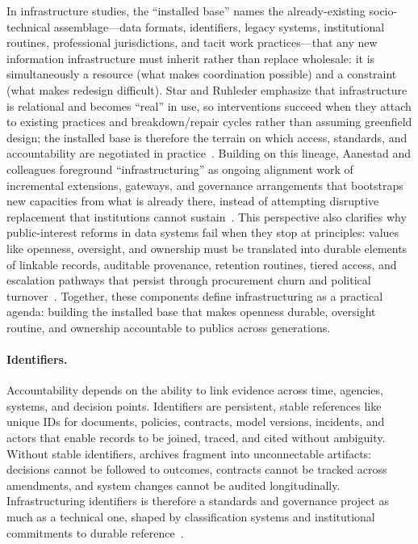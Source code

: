 \documentclass[acmsmall,screen]{acmart}
\begin{document}
In infrastructure studies, the ``installed base'' names the already-existing socio-technical assemblage—data formats, identifiers, legacy systems, institutional routines, professional jurisdictions, and tacit work practices—that any new information infrastructure must inherit rather than replace wholesale: it is simultaneously a resource (what makes coordination possible) and a constraint (what makes redesign difficult). Star and Ruhleder emphasize that infrastructure is relational and becomes “real” in use, so interventions succeed when they attach to existing practices and breakdown/repair cycles rather than assuming greenfield design; the installed base is therefore the terrain on which access, standards, and accountability are negotiated in practice~\cite{starStepsEcologyInfrastructure1994a,starEthnographyInfrastructure1999a}. Building on this lineage, Aanestad and colleagues foreground “infrastructuring” as ongoing alignment work of incremental extensions, gateways, and governance arrangements that bootstraps new capacities from what is already there, instead of attempting disruptive replacement that institutions cannot sustain~\cite{aanestadInformationInfrastructuresChallenge2017,pipekInfrastructuringIntegratedPerspective2009a}. This perspective also clarifies why public-interest reforms in data systems fail when they stop at principles: values like openness, oversight, and ownership must be translated into durable elements of linkable records, auditable provenance, retention routines, tiered access, and escalation pathways that persist through procurement churn and political turnover~\cite{hansethDesignTheoryDynamic2010,karastiStudyingInfrastructuringEthnographically2018a}. Together, these components define infrastructuring as a practical agenda: building the installed base that makes openness durable, oversight routine, and ownership accountable to publics across generations.

\paragraph{Identifiers.}
Accountability depends on the ability to link evidence across time, agencies, systems, and decision points. Identifiers are persistent, stable references like unique IDs for documents, policies, contracts, model versions, incidents, and actors that enable records to be joined, traced, and cited without ambiguity. Without stable identifiers, archives fragment into unconnectable artifacts: decisions cannot be followed to outcomes, contracts cannot be tracked across amendments, and system changes cannot be audited longitudinally. Infrastructuring identifiers is therefore a standards and governance project as much as a technical one, shaped by classification systems and institutional commitments to durable reference~\cite{bowker_sorting_2000}.
\end{document}
